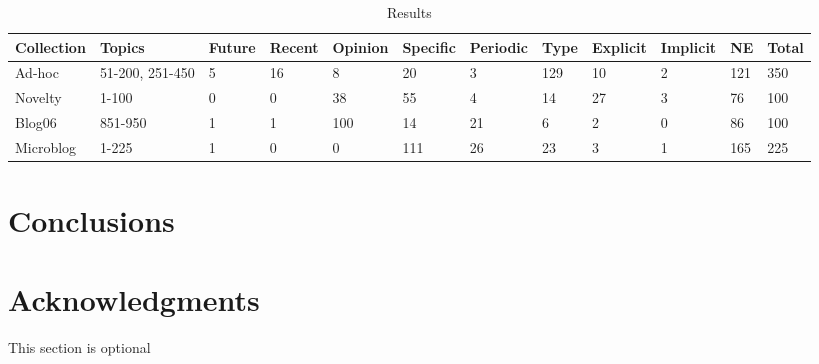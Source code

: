 \documentclass{sig-alternate}
\begin{document}
\begin{table}
\small
\begin{tabular}{| l | l | l | l | l | l | l | l | l | l | l | l |} \hline
\bf{Collection} & \bf{Topics}   & \bf{Future} & \bf{Recent} & \bf{Opinion} & \bf{Specific} & \bf{Periodic} & \bf{Type} & \bf{Explicit} & \bf{Implicit} & \bf{NE} & \bf{Total} \\ \hline
Ad-hoc & 51-200, 251-450 & 5 & 16 & 8 & 20 & 3 & 129 & 10 & 2 & 121 & 350 \\ \hline
Novelty & 1-100 & 0 & 0 & 38 & 55 & 4 & 14 & 27 & 3 & 76 & 100\\ \hline
Blog06 & 851-950 & 1 & 1 & 100 & 14 & 21 & 6 & 2 & 0 & 86 & 100 \\ \hline
Microblog & 1-225 & 1 & 0 & 0 & 111 & 26 & 23 & 3 & 1 & 165 & 225 \\ \hline
\end{tabular}
\caption{Results}
\label{table.results}
\end{table}


\section{Conclusions}


\section{Acknowledgments}
This section is optional

%



  

\appendix
\end{document}
